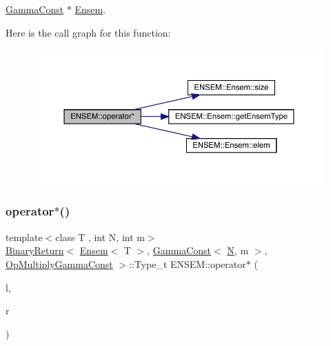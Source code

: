 \mbox{\hyperlink{classENSEM_1_1GammaConst}{Gamma\+Const}} $\ast$ \mbox{\hyperlink{classENSEM_1_1Ensem}{Ensem}}. 

Here is the call graph for this function\+:\nopagebreak
\begin{figure}[H]
\begin{center}
\leavevmode
\includegraphics[width=350pt]{d1/d9e/group__eensem_gab92286e5b611f00cb8f733f9d41d06a4_cgraph}
\end{center}
\end{figure}
\mbox{\label{group__eensem_gaada3f84ca5744bafe60557482cc90c26}} 
\subsubsection{\texorpdfstring{operator$\ast$()}{operator*()}\hspace{0.1cm}{\footnotesize\ttfamily [5/11]}}
{\footnotesize\ttfamily template$<$class T , int N, int m$>$ \\
\mbox{\hyperlink{structENSEM_1_1BinaryReturn}{Binary\+Return}}$<$ \mbox{\hyperlink{classENSEM_1_1Ensem}{Ensem}}$<$ T $>$, \mbox{\hyperlink{classENSEM_1_1GammaConst}{Gamma\+Const}}$<$ \mbox{\hyperlink{operator__name__util_8cc_a7722c8ecbb62d99aee7ce68b1752f337}{N}}, m $>$, \mbox{\hyperlink{structENSEM_1_1OpMultiplyGammaConst}{Op\+Multiply\+Gamma\+Const}} $>$\+::Type\+\_\+t E\+N\+S\+E\+M\+::operator$\ast$ (\begin{DoxyParamCaption}\item[{const \mbox{\hyperlink{classENSEM_1_1Ensem}{Ensem}}$<$ T $>$ \&}]{l,  }\item[{const \mbox{\hyperlink{classENSEM_1_1GammaConst}{Gamma\+Const}}$<$ \mbox{\hyperlink{operator__name__util_8cc_a7722c8ecbb62d99aee7ce68b1752f337}{N}}, m $>$ \&}]{r }\end{DoxyParamCaption})\hspace{0.3cm}{\ttfamily [inline]}}



